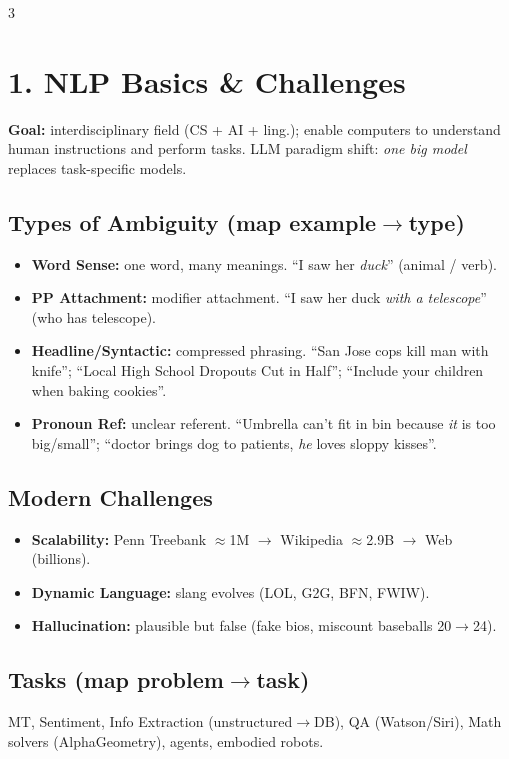 \documentclass[8pt,a4paper,landscape]{extarticle}
\begin{document}
\begin{multicols*}{3}
\raggedright

    \section*{1. NLP Basics \& Challenges}
    \textbf{Goal:} interdisciplinary field (CS + AI + ling.); enable computers to understand human instructions and perform tasks. LLM paradigm shift: \emph{one big model} replaces task-specific models.

    \subsection*{Types of Ambiguity (map example$\to$type)}
    \begin{itemize}
        \item \textbf{Word Sense:} one word, many meanings. ``I saw her \emph{duck}'' (animal / verb).
        \item \textbf{PP Attachment:} modifier attachment. ``I saw her duck \emph{with a telescope}'' (who has telescope).
        \item \textbf{Headline/Syntactic:} compressed phrasing. ``San Jose cops kill man with knife''; ``Local High School Dropouts Cut in Half''; ``Include your children when baking cookies''.
        \item \textbf{Pronoun Ref:} unclear referent. ``Umbrella can't fit in bin because \emph{it} is too big/small''; ``doctor brings dog to patients, \emph{he} loves sloppy kisses''.
    \end{itemize}

    \subsection*{Modern Challenges}
    \begin{itemize}
        \item \textbf{Scalability:} Penn Treebank $\approx$1M $\to$ Wikipedia $\approx$2.9B $\to$ Web (billions).
        \item \textbf{Dynamic Language:} slang evolves (LOL, G2G, BFN, FWIW).
        \item \textbf{Hallucination:} plausible but false (fake bios, miscount baseballs 20$\to$24).
    \end{itemize}

    \subsection*{Tasks (map problem$\to$task)}
    MT, Sentiment, Info Extraction (unstructured$\to$DB), QA (Watson/Siri), Math solvers (AlphaGeometry), agents, embodied robots.


\end{multicols*}
\end{document}
